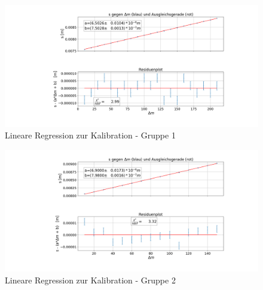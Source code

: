 \documentclass[a4paper, 11pt]{article}
\begin{document}
\begin{figure}[H]
	\centering
	\includegraphics[trim={8cm 2cm 3cm 1cm},clip=true,width=1.1\linewidth]{./Bilder/Kalibration_1.png}
	\caption{Lineare Regression zur Kalibration - Gruppe 1}
	\label{pic:Kalibration_1}	
\end{figure}

\begin{figure}[H]
	\centering
	\includegraphics[trim={8cm 1cm 1cm 1cm},clip=true,width=1.1\linewidth]{./Bilder/Kalibration_2.png}
	\caption{Lineare Regression zur Kalibration - Gruppe 2}
	\label{pic:Kalibration_2}	
\end{figure}
\end{document}
